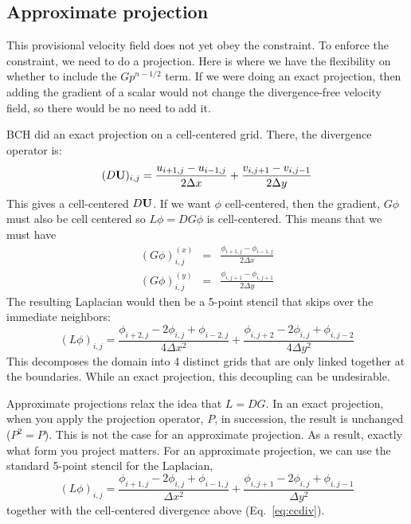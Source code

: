 \subsection{Approximate projection}

This provisional velocity field does not yet obey the constraint.  To
enforce the constraint, we need to do a projection.  Here is where we
have the flexibility on whether to include the $G p^{n-1/2}$ term.  If
we were doing an exact projection, then adding the gradient of a
scalar would not change the divergence-free velocity field, so there
would be no need to add it.  

BCH did an exact projection on a cell-centered grid.  There, the
divergence operator is:
\begin{equation}
(D {\bf U})_{i,j} = \frac{u_{i+1,j} - u_{i-1,j}}{2\Delta x} +
              \frac{v_{i,j+1} - v_{i,j-1}}{2\Delta y} \label{eq:ccdiv}
\end{equation}
This gives a cell-centered $D{\bf U}$.  If we want $\phi$ cell-centered, then
the gradient, $G\phi$ must also be cell centered so $L\phi = DG\phi$ is 
cell-centered.  This means that we must have
\begin{eqnarray}
(G\phi)^{(x)}_{i,j} &=& \frac{\phi_{i+1,j} - \phi_{i-1,j}}{2\Delta x} \\
(G\phi)^{(y)}_{i,j} &=& \frac{\phi_{i,j+1} - \phi_{i,j+1}}{2\Delta y}
\end{eqnarray}
The resulting Laplacian would then be a 5-point stencil that skips over
the immediate neighbors:
\begin{equation}
(L\phi)_{i,j} = \frac{\phi_{i+2,j} -2\phi_{i,j} + \phi_{i-2,j}}{4 \Delta x^2} +
    \frac{\phi_{i,j+2} -2\phi_{i,j} + \phi_{i,j-2}}{4 \Delta y^2}
\end{equation}
This decomposes the domain into 4 distinct grids that are only linked 
together at the boundaries.  While an exact projection, this decoupling
can be undesirable.

Approximate projections relax the idea that $L = DG$.  In an exact
projection, when you apply the projection operator, $P$, in
succession, the result is unchanged ($P^2 = P$).  This is not the case
for an approximate projection.  As a result, exactly what form you
project matters.  For an approximate projection, we can use the 
standard 5-point stencil for the Laplacian,
\begin{equation}
(L\phi)_{i,j} = \frac{\phi_{i+1,j} -2\phi_{i,j} + \phi_{i-1,j}}{\Delta x^2} +
    \frac{\phi_{i,j+1} -2\phi_{i,j} + \phi_{i,j-1}}{\Delta y^2}
\end{equation}
together with the cell-centered divergence above (Eq.~\ref{eq:ccdiv}).


